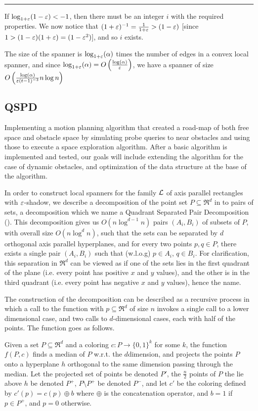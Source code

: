 \documentclass[12pt]{article}%
\begin{document}
\hrule

If $\log_{1+\varepsilon}(1-\varepsilon)<-1$, then there must be an integer $i$ with
the required properties. We now notice that
$(1+\varepsilon)^{-1}=\frac{1}{1+\varepsilon}>(1-\varepsilon)$ [since
$1>(1-\varepsilon)(1+\varepsilon)=(1-\varepsilon^2)$], and so $i$ exists.

The size of the spanner is $\log_{1+\varepsilon}(\alpha)$ times the number of
edges in a convex local spanner, and since
$\log_{1+\varepsilon}(\alpha)=O\left(\frac{\log(\alpha)}{\varepsilon}\right)$, we
have a spanner of size
$O\left(\frac{\log(\alpha)}{\varepsilon (t-1)^{-3}}n\log n\right)$

\subsection{Q{}S{}PD}
Implementing a motion planning algorithm that created a road-map of
both free space and obstacle space by simulating probe queries to near
obstacles and using those to execute a space exploration algorithm.
After a basic algorithm is implemented and tested, our goals will
include extending the algorithm for the case of dynamic obstacles, and
optimization of the data structure at the base of the algorithm.

In order to construct local spanners for the family $\mathcal{L}$ of axis
parallel rectangles with $\varepsilon$-shadow, we describe a decomposition of
the point set $P\subseteq \Re^d$ in to pairs of sets, a decomposition
which we name a Quadrant Separated Pair Decomposition (\QSPD). This
decomposition gives us $O(n\log^{d-1}n)$ pairs $(A_i,B_i)$ of subsets
of $P$, with overall size $O(n\log^{d}n)$, such that the sets can be
separated by $d$ orthogonal axis parallel hyperplanes, and for every
two points $p,q\in P$, there exists a single pair $(A_i,B_i)$ such
that (w.l.o.g) $p\in A_i$, $q\in B_i$. For clarification, this
separation in $\Re^d$ can be viewed as if one of the sets lies in the
first quadrant of the plane (i.e. every point has positive $x$ and $y$
values), and the other is in the third quadrant (i.e. every point has
negative $x$ and $y$ values), hence the name.

The construction of the decomposition can be described as a recursive
process in which a call to the function with $p\subseteq \Re^d$ of
size $n$ invokes a single call to a lower dimensional case, and two
calls to $d$-dimensional cases, each with half of the points. The
function goes as follows.

Given a set $P\subseteq \Re^d$ and a coloring
$c:P\longrightarrow \{0,1\}^k$ for some $k$, the function $f(P,c)$
finds a median of $P$ w.r.t. the $d$\th dimension, and projects the
points $P$ onto a hyperplane $h$ orthogonal to the same dimension
passing through the median. Let the projected set of points be denoted
$P'$, the $\frac{n}{2}$ points of $P$ the lie above $h$ be denoted
$P^+$, $P\setminus P^+$ be denoted $P^-$, and let $c'$ be the coloring
defined by $c'(p)=c(p)\oplus b$ where $\oplus$ is the concatenation
operator, and $b=1$ if $p\in P^+$, and $p=0$ otherwise.
\end{document}
